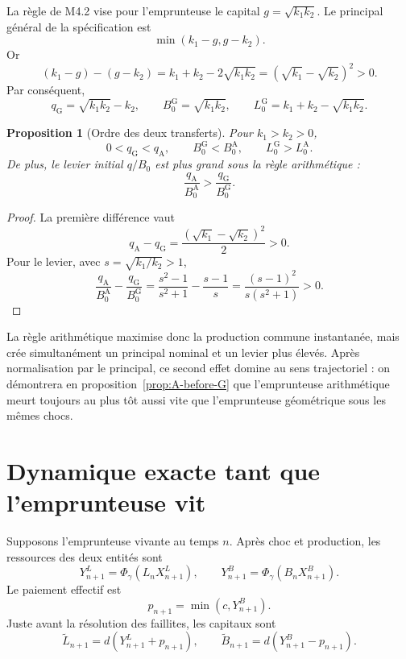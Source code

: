 \documentclass[11pt,a4paper]{article}
\newcommand{\1}{\mathbf 1}
\newtheorem{proposition}[theorem]{Proposition}
\theoremstyle{definition}
\theoremstyle{remark}
\begin{document}
La règle de M4.2 vise pour l'emprunteuse le capital
$g=\sqrt{k_1k_2}$. Le principal général de la spécification est
\[
\min(k_1-g,g-k_2).
\]
Or
\[
(k_1-g)-(g-k_2)=k_1+k_2-2\sqrt{k_1k_2}
=(\sqrt{k_1}-\sqrt{k_2})^2>0.
\]
Par conséquent,
\begin{equation}
q_{\mathrm G}=\sqrt{k_1k_2}-k_2,\qquad
B_0^{\mathrm G}=\sqrt{k_1k_2},\qquad
L_0^{\mathrm G}=k_1+k_2-\sqrt{k_1k_2}.
\label{eq:qG}
\end{equation}

\begin{proposition}[Ordre des deux transferts]
Pour $k_1>k_2>0$,
\[
0<q_{\mathrm G}<q_{\mathrm A},\qquad
B_0^{\mathrm G}<B_0^{\mathrm A},\qquad
L_0^{\mathrm G}>L_0^{\mathrm A}.
\]
De plus, le levier initial $q/B_0$ est plus grand sous la règle
arithmétique :
\begin{equation}
\frac{q_{\mathrm A}}{B_0^{\mathrm A}}
>\frac{q_{\mathrm G}}{B_0^{\mathrm G}}.
\label{eq:leverage-order}
\end{equation}
\end{proposition}
\begin{proof}
La première différence vaut
\[
q_{\mathrm A}-q_{\mathrm G}
=\frac{(\sqrt{k_1}-\sqrt{k_2})^2}{2}>0.
\]
Pour le levier, avec $s=\sqrt{k_1/k_2}>1$,
\[
\frac{q_{\mathrm A}}{B_0^{\mathrm A}}
-\frac{q_{\mathrm G}}{B_0^{\mathrm G}}
=\frac{s^2-1}{s^2+1}-\frac{s-1}{s}
=\frac{(s-1)^2}{s(s^2+1)}>0.
\]
\end{proof}

La règle arithmétique maximise donc la production commune instantanée,
mais crée simultanément un principal nominal et un levier plus élevés.
Après normalisation par le principal, ce second effet domine au sens
trajectoriel : on démontrera en proposition~\ref{prop:A-before-G} que
l'emprunteuse arithmétique meurt toujours au plus tôt aussi vite que
l'emprunteuse géométrique sous les mêmes chocs.

\section{Dynamique exacte tant que l'emprunteuse vit}

Supposons l'emprunteuse vivante au temps $n$. Après choc et production,
les ressources des deux entités sont
\[
Y^L_{n+1}=\Phi_\gamma(L_nX^L_{n+1}),\qquad
Y^B_{n+1}=\Phi_\gamma(B_nX^B_{n+1}).
\]
Le paiement effectif est
\begin{equation}
p_{n+1}=\min(c,Y^B_{n+1}).
\label{eq:payment}
\end{equation}
Juste avant la résolution des faillites, les capitaux sont
\begin{equation}
\widetilde L_{n+1}=d(Y^L_{n+1}+p_{n+1}),\qquad
\widetilde B_{n+1}=d(Y^B_{n+1}-p_{n+1}).
\label{eq:tentative}
\end{equation}
\end{document}
